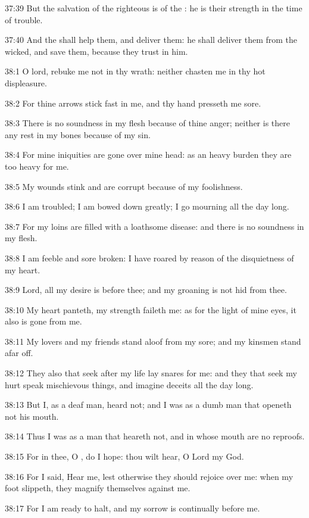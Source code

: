 37:39 But the salvation of the righteous is of the \LORD: he is their
strength in the time of trouble.

37:40 And the \LORD shall help them, and deliver them: he shall deliver
them from the wicked, and save them, because they trust in him.



38:1 O lord, rebuke me not in thy wrath: neither chasten me in thy hot
displeasure.

38:2 For thine arrows stick fast in me, and thy hand presseth me sore.

38:3 There is no soundness in my flesh because of thine anger; neither
is there any rest in my bones because of my sin.

38:4 For mine iniquities are gone over mine head: as an heavy burden
they are too heavy for me.

38:5 My wounds stink and are corrupt because of my foolishness.

38:6 I am troubled; I am bowed down greatly; I go mourning all the day
long.

38:7 For my loins are filled with a loathsome disease: and there is no
soundness in my flesh.

38:8 I am feeble and sore broken: I have roared by reason of the
disquietness of my heart.

38:9 Lord, all my desire is before thee; and my groaning is not hid
from thee.

38:10 My heart panteth, my strength faileth me: as for the light of
mine eyes, it also is gone from me.

38:11 My lovers and my friends stand aloof from my sore; and my
kinsmen stand afar off.

38:12 They also that seek after my life lay snares for me: and they
that seek my hurt speak mischievous things, and imagine deceits all
the day long.

38:13 But I, as a deaf man, heard not; and I was as a dumb man that
openeth not his mouth.

38:14 Thus I was as a man that heareth not, and in whose mouth are no
reproofs.

38:15 For in thee, O \LORD, do I hope: thou wilt hear, O Lord my God.

38:16 For I said, Hear me, lest otherwise they should rejoice over me:
when my foot slippeth, they magnify themselves against me.

38:17 For I am ready to halt, and my sorrow is continually before me.


